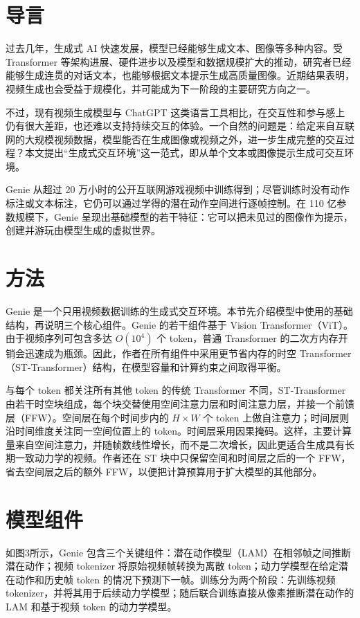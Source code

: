 \documentclass[10pt]{article}
\begin{document}
\section{导言}
过去几年，生成式 AI 快速发展，模型已经能够生成文本、图像等多种内容。受 Transformer 等架构进展、硬件进步以及模型和数据规模扩大的推动，研究者已经能够生成连贯的对话文本，也能够根据文本提示生成高质量图像。近期结果表明，视频生成也会受益于规模化，并可能成为下一阶段的主要研究方向之一。

不过，现有视频生成模型与 ChatGPT 这类语言工具相比，在交互性和参与感上仍有很大差距，也还难以支持持续交互的体验。一个自然的问题是：给定来自互联网的大规模视频数据，模型能否在生成图像或视频之外，进一步生成完整的交互过程？本文提出“生成式交互环境”这一范式，即从单个文本或图像提示生成可交互环境。

Genie 从超过 20 万小时的公开互联网游戏视频中训练得到；尽管训练时没有动作标注或文本标注，它仍可以通过学得的潜在动作空间进行逐帧控制。在 110 亿参数规模下，Genie 呈现出基础模型的若干特征：它可以把未见过的图像作为提示，创建并游玩由模型生成的虚拟世界。

\section{方法}

Genie 是一个只用视频数据训练的生成式交互环境。本节先介绍模型中使用的基础结构，再说明三个核心组件。Genie 的若干组件基于 Vision Transformer（ViT）。由于视频序列可包含多达 $O(10^4)$ 个 token，普通 Transformer 的二次方内存开销会迅速成为瓶颈。因此，作者在所有组件中采用更节省内存的时空 Transformer（ST-Transformer）结构，在模型容量和计算约束之间取得平衡。

与每个 token 都关注所有其他 token 的传统 Transformer 不同，ST-Transformer 由若干时空块组成，每个块交替使用空间注意力层和时间注意力层，并接一个前馈层（FFW）。空间层在每个时间步内的 $H\times W$ 个 token 上做自注意力；时间层则沿时间维度关注同一空间位置上的 token。时间层采用因果掩码。这样，主要计算量来自空间注意力，并随帧数线性增长，而不是二次增长，因此更适合生成具有长期一致动力学的视频。作者还在 ST 块中只保留空间和时间层之后的一个 FFW，省去空间层之后的额外 FFW，以便把计算预算用于扩大模型的其他部分。

\section*{模型组件}

如图3所示，Genie 包含三个关键组件：潜在动作模型（LAM）在相邻帧之间推断潜在动作；视频 tokenizer 将原始视频帧转换为离散 token；动力学模型在给定潜在动作和历史帧 token 的情况下预测下一帧。训练分为两个阶段：先训练视频 tokenizer，并将其用于后续动力学模型；随后联合训练直接从像素推断潜在动作的 LAM 和基于视频 token 的动力学模型。
\end{document}
